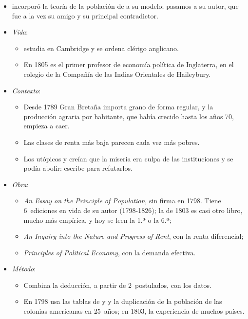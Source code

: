\documentclass[11pt]{article}
\begin{document}
\begin{itemize}
\item {} incorporó la teoría de la población de  a su modelo; pasamos a su autor, que fue a la vez su amigo y su principal contradictor.
\item \emph{Vida}:
  \begin{itemize}
  \item {} estudia en Cambridge y se ordena clérigo anglicano.
  \item En 1805 es el primer profesor de economía política de Inglaterra, en el colegio de la Compañía de las Indias Orientales de Haileybury\nocite{HET2026Malthus}.
  \end{itemize}
\item \emph{Contexto}:
  \begin{itemize}
  \item Desde 1789 Gran Bretaña importa grano de forma regular\nocite{TNA2026Grain}, y la producción agraria por habitante, que había crecido hasta los años 70, empieza a caer\nocite{BoE2017Millennium}.
  \item Las clases de renta más baja parecen cada vez más pobres.
  \item Los utópicos  y  creían que la miseria era culpa de las instituciones y se podía abolir:  escribe para refutarlos.
  \end{itemize}
\item \emph{Obra}:
  \begin{itemize}
  \item \emph{An Essay on the Principle of Population}\nocite{Malthus1798Essay}, sin firma en 1798. Tiene 6~ediciones en vida de su autor (1798-1826); la de 1803 es casi otro libro, mucho más empírica, y hoy se leen la 1.ª o la 6.ª\nocite{Malthus1826Essay};
  \item \emph{An Inquiry into the Nature and Progress of Rent}\nocite{Malthus1815Rent}, con la renta diferencial;
  \item \emph{Principles of Political Economy}\nocite{Malthus1820Principles}, con la demanda efectiva.
  \end{itemize}
\item \emph{Método}:
  \begin{itemize}
  \item Combina la deducción, a partir de 2~postulados, con los datos.
  \item En 1798 usa las tablas de  y  y la duplicación de la población de las colonias americanas en 25~años; en 1803, la experiencia de muchos países.

\end{itemize}
\end{itemize}
\end{document}
